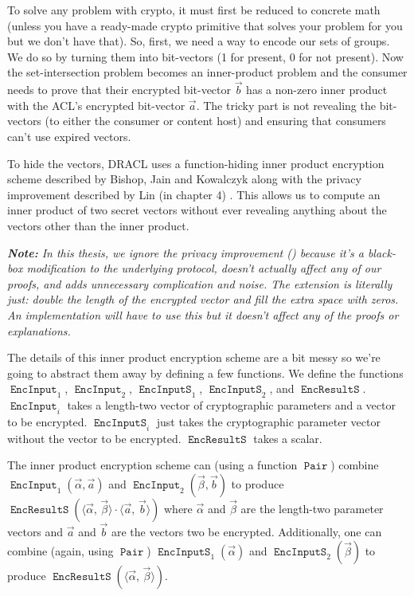 \documentclass[pdftex,12pt,a4papaer,twoside,notitlepage]{report}
\newcommand{\note}[1]{\vspace{1em} \begin{spacing}{1}\textit{\textbf{Note:} #1}\end{spacing}\vspace{1em}}
\newcommand{\iprod}[2]{\langle #1,\,#2\rangle}
\DeclareMathOperator{\ein}{\mathtt{EncInput}}
\DeclareMathOperator{\eins}{\mathtt{EncInputS}}
\DeclareMathOperator{\eouts}{\mathtt{EncResultS}}
\DeclareMathOperator{\pair}{\mathtt{Pair}}
\begin{document}
To solve any problem with crypto, it must first be reduced to concrete math
(unless you have a ready-made crypto primitive that solves your problem for you
but we don't have that). So, first, we need a way to encode our sets of groups.
We do so by turning them into bit-vectors (1 for present, 0 for not present).
Now the set-intersection problem becomes an inner-product problem and the
consumer needs to prove that their encrypted bit-vector $\vec{b}$ has a non-zero
inner product with the ACL's encrypted bit-vector $\vec{a}$. The tricky part is
not revealing the bit-vectors (to either the consumer or content host) and
ensuring that consumers can't use expired vectors.

To hide the vectors, DRACL uses a function-hiding inner product encryption
scheme described by Bishop, Jain and Kowalczyk \cite{inner-product} along with
the privacy improvement described by Lin (in chapter 4)
\cite{inner-product-ext}. This allows us to compute an inner product of two
secret vectors without ever revealing anything about the vectors other than the
inner product.

\note{In this thesis, we ignore the privacy improvement
  (\cite{inner-product-ext}) because it's a black-box modification to the
  underlying protocol, doesn't actually affect any of our proofs, and adds
  unnecessary complication and noise. The extension is literally just: double
  the length of the encrypted vector and fill the extra space with zeros. An
  implementation will have to use this but it doesn't affect any of the proofs
  or explanations.}

\newcommand{\Ap}{\vec{\alpha}}
\newcommand{\Bp}{\vec{\beta}}
\newcommand{\ABp}{\iprod{\Ap}{\Bp}}

\sloppy The details of this inner product encryption scheme are a bit messy so
we're going to abstract them away by defining a few functions. We define the
functions $\ein_1$, $\ein_2$, $\eins_1$, $\eins_2$, and $\eouts$. $\ein_i$ takes
a length-two vector of cryptographic parameters and a vector to be encrypted.
$\eins_i$ just takes the cryptographic parameter vector without the vector to be
encrypted. $\eouts$ takes a scalar.

\sloppy The inner product encryption scheme can (using a function $\pair$)
combine $\ein_1(\Ap, \vec{a})$ and \allowbreak$\ein_2(\Bp, \vec{b})$ to produce
$\eouts(\ABp\cdot\iprod{\vec{a}}{\vec{b}})$ where $\Ap$ and $\Bp$ are the
length-two parameter vectors and $\vec{a}$ and $\vec{b}$ are the vectors two be
encrypted. Additionally, one can combine (again, using $\pair$) $\eins_1(\Ap)$
and $\eins_2(\Bp)$ to produce $\eouts(\ABp)$.
\end{document}
